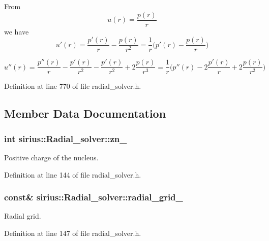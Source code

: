 From \[ u(r) = \frac{p(r)}{r} \] we have \[ u'(r) = \frac{p'(r)}{r} - \frac{p(r)}{r^2} = \frac{1}{r}\big(p'(r) - \frac{p(r)}{r}\big) \]

\[ u''(r) = \frac{p''(r)}{r} - \frac{p'(r)}{r^2} - \frac{p'(r)}{r^2} + 2 \frac{p(r)}{r^3} = \frac{1}{r}\big(p''(r) - 2 \frac{p'(r)}{r} + 2 \frac{p(r)}{r^2}\big) \] 

Definition at line 770 of file radial\+\_\+solver.\+h.



\subsection{Member Data Documentation}
\hypertarget{classsirius_1_1_radial__solver_a7f03ef84b603fa56fa0ee2d263f48eed}{}
\subsubsection[{zn\+\_\+}]{\setlength{\rightskip}{0pt plus 5cm}int sirius\+::\+Radial\+\_\+solver\+::zn\+\_\+\hspace{0.3cm}{\ttfamily [protected]}}\label{classsirius_1_1_radial__solver_a7f03ef84b603fa56fa0ee2d263f48eed}


Positive charge of the nucleus. 



Definition at line 144 of file radial\+\_\+solver.\+h.

\hypertarget{classsirius_1_1_radial__solver_a363ba1f94d4ae7194fb65119c4af455d}{}
\subsubsection[{radial\+\_\+grid\+\_\+}]{ const\& sirius\+::\+Radial\+\_\+solver\+::radial\+\_\+grid\+\_\+\hspace{0.3cm}{\ttfamily [protected]}}\label{classsirius_1_1_radial__solver_a363ba1f94d4ae7194fb65119c4af455d}


Radial grid. 



Definition at line 147 of file radial\+\_\+solver.\+h.

